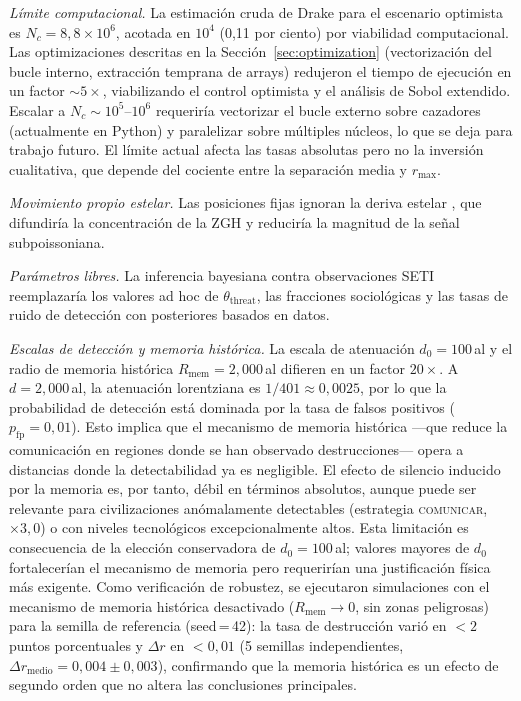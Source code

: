\documentclass[11pt,a4paper,onecolumn]{article}
\begin{document}
\begin{table}[h]
\textit{Límite computacional.}
La estimación cruda de Drake para el escenario optimista es
$N_c = 8{,}8\times10^6$, acotada en $10^4$ (0{,}11 por ciento) por
viabilidad computacional.
Las optimizaciones descritas en la Sección~\ref{sec:optimization}
(vectorización del bucle interno, extracción temprana de arrays)
redujeron el tiempo de ejecución en un factor $\sim 5\times$,
viabilizando el control optimista y el análisis de Sobol extendido.
Escalar a $N_c \sim 10^5$--$10^6$ requeriría vectorizar el bucle
externo sobre cazadores (actualmente en Python) y paralelizar sobre
múltiples núcleos, lo que se deja para trabajo futuro.
El límite actual afecta las tasas absolutas pero no la inversión
cualitativa, que depende del cociente entre la separación media y
$r_\text{max}$.

\textit{Movimiento propio estelar.}
Las posiciones fijas ignoran la deriva estelar
\citep[$\sim 30$\,km\,s$^{-1}$;][]{carrollnellenback2019},
que difundiría la concentración de la ZGH y reduciría la magnitud de
la señal subpoissoniana.

\textit{Parámetros libres.}
La inferencia bayesiana contra observaciones SETI reemplazaría los
valores ad hoc de $\theta_\text{threat}$, las fracciones sociológicas
y las tasas de ruido de detección con posteriores basados en datos.

\textit{Escalas de detección y memoria histórica.}
La escala de atenuación $d_0 = 100$\,al y el radio de memoria histórica
$R_\text{mem} = 2{,}000$\,al difieren en un factor $20\times$.
A $d = 2{,}000$\,al, la atenuación lorentziana es $1/401 \approx
0{,}0025$, por lo que la probabilidad de detección está dominada por
la tasa de falsos positivos ($p_\text{fp} = 0{,}01$).
Esto implica que el mecanismo de memoria histórica —que reduce la
comunicación en regiones donde se han observado destrucciones— opera
a distancias donde la detectabilidad ya es negligible.
El efecto de silencio inducido por la memoria es, por tanto, débil en
términos absolutos, aunque puede ser relevante para civilizaciones
anómalamente detectables (estrategia \textsc{comunicar}, $\times 3{,}0$)
o con niveles tecnológicos excepcionalmente altos.
Esta limitación es consecuencia de la elección conservadora de
$d_0 = 100$\,al; valores mayores de $d_0$ fortalecerían el mecanismo
de memoria pero requerirían una justificación física más exigente.
Como verificación de robustez, se ejecutaron simulaciones con el
mecanismo de memoria histórica desactivado ($R_\text{mem} \to 0$,
sin zonas peligrosas) para la semilla de referencia (seed\,=\,42):
la tasa de destrucción varió en $< 2$ puntos porcentuales y
$\Delta r$ en $< 0{,}01$ (5 semillas independientes, $\Delta r_\text{medio} = 0{,}004 \pm 0{,}003$), confirmando que la memoria histórica
es un efecto de segundo orden que no altera las conclusiones
principales.


\end{table}
\end{document}

